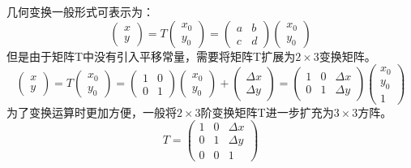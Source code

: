 \documentclass[11pt]{article}
\begin{document}
几何变换一般形式可表示为：
$$\begin{pmatrix}x \\y\end{pmatrix}=T\begin{pmatrix}x_0 \\y_0\end{pmatrix}=\begin{pmatrix}a& b \\ c& d\end{pmatrix}\begin{pmatrix}x_0 \\ y_0\end{pmatrix}$$
但是由于矩阵T中没有引入平移常量，需要将矩阵T扩展为$2\times 3$变换矩阵。
$$\begin{pmatrix}x \\y\end{pmatrix}=T\begin{pmatrix}x_0 \\y_0\end{pmatrix}=\begin{pmatrix}1& 0 \\ 0& 1\end{pmatrix}\begin{pmatrix}x_0 \\ y_0\end{pmatrix} + \begin{pmatrix}\Delta x \\ \Delta y\end{pmatrix} = \begin{pmatrix}1 & 0 & \Delta x \\ 0 & 1 &\Delta y\end{pmatrix}\begin{pmatrix}x_0 \\ y_0 \\ 1\end{pmatrix}$$
为了变换运算时更加方便，一般将$2\times 3$阶变换矩阵T进一步扩充为$3\times 3$方阵。
$$T = \begin{pmatrix}1 & 0 & \Delta x \\ 0 & 1 &\Delta y\\ 0 & 0 & 1\end{pmatrix}$$
\end{document}
